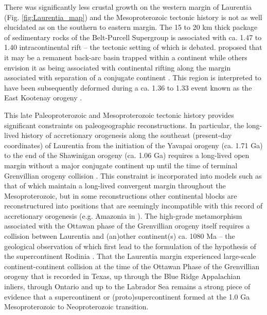 \documentclass[11pt,letterpaper]{article}
\begin{document}
There was significantly less crustal growth on the western margin of Laurentia (Fig. \ref{fig:Laurentia_map}) and the Mesoproterozoic tectonic history is not as well elucidated as on the southern to eastern margin. The 15 to 20 km thick package of sedimentary rocks of the Belt-Purcell Supergroup is associated with ca. 1.47 to 1.40 intracontinental rift -- the tectonic setting of which is debated. \citet{Hoffman1989a} proposed that it may be a remanent back-arc basin trapped within a continent while others envision it as being associated with continental rifting along the margin associated with separation of a conjugate continent \citep[e.g.]{Jones2015a}. This region is interpreted to have been subsequently deformed during a ca. 1.36 to 1.33 event known as the East Kootenay orogeny \citep{McMechan1982a, Nesheim2012a, McFarlane2015a}. 

This late Paleoproterozoic and Mesoproterozoic tectonic history provides significant constraints on paleogeographic reconstructions. In particular, the long-lived history of accretionary orogenesis along the southeast (present-day coordinates) of Laurentia from the initiation of the Yavapai orogeny (ca. 1.71 Ga) to the end of the Shawinigan orogeny (ca. 1.06 Ga) requires a long-lived open margin without a major conjugate continent up until the time of terminal Grenvillian orogeny collision \citep{Karlstrom2001a}. This constraint is incorporated into models such as that of \citet{Pehrsson2015a} which maintain a long-lived convergent margin throughout the Mesoproterozoic, but in some reconstructions other continental blocks are reconstructured into positions that are seemingly incompatible with this record of accretionary orogenesis (e.g. Amazonia in \citealp{Elming2009a}). The high-grade metamorphism associated with the Ottawan phase of the Grenvillian orogeny itself requires a collision between Laurentia and (an)other continent(s) ca. 1080 Ma -- the geological observation of which first lead to the formulation of the hypothesis of the supercontinent Rodinia \citep{Hoffman1991a}. That the Laurentia margin experienced large-scale continent-continent collision at the time of the Ottawan Phase of the Grenvillian orogeny that is recorded in Texas, up through the Blue Ridge Appalachian inliers, through Ontario and up to the Labrador Sea remains a strong piece of evidence that a supercontinent or (proto)supercontinent formed at the 1.0 Ga Mesoproterozoic to Neoproterozoic transition.
\end{document}
